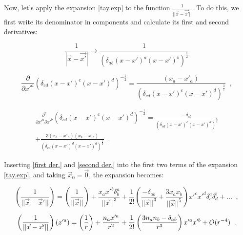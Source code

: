

Now, let's apply the expansion \ref{tay.exp} to the function $\frac{1}{||\vec{x}-\vec{x'}||}$. To do this, we first write its denominator in components and calculate its first and second derivatives:

$$ \frac{1}{|\vec{x}-\vec{x'}|} \rightarrow \frac{1}{(\delta_{ab} (x- x')^a (x- x')^b)^\frac{1}{2}}$$

\begin{equation}\label{first der.}
\frac{\partial}{\partial x'^a}(\delta_{cd} (x- x')^c (x- x')^d)^{-\frac{1}{2}} = \frac{(x_a - x'_a)}{(\delta_{cd} (x- x')^c (x- x')^d)^{\frac{3}{2}}} \;\; ,
\end{equation}

\begin{multline}\label{second der.}
\frac{\partial^2}{\partial x'^a \partial x'^b}(\delta_{cd} (x- x')^c (x- x')^d)^{-\frac{1}{2}} = \frac{-\delta_{ab}}{(\delta_{cd} (x- x')^c (x- x')^d)^{\frac{3}{2}}}\\ +\frac{3(x_a - x'_a)(x_b - x'_b)}{ (\delta_{cd} (x- x')^d (x- x')^d)^{\frac{5}{2}} } \;\; .
\end{multline}


Inserting  \ref{first der.} and \ref{second der.} into the first two terms of the expansion \ref{tay.exp}, and taking $\vec{x}_0 = \vec{0}$, the expansion becomes: 

\begin{equation}
\left( \frac{1}{|| \vec{x} - \vec{x}'||} \right) = \left( \frac{1}{|| \vec{x}||} \right) + \frac{x_a x'^b \delta^a_b}{||\vec{x}||^3} + \frac{1}{2!} \left(\frac{-\delta_{ab}}{||\vec{x}||^3} + \frac{3 x_a x_b}{||\vec{x}||^5}  \right) x'^c x'^d \delta^a_c \delta^b_d +  ... \;\; ,
\end{equation}


\begin{equation}
\left( \frac{1}{|| \vec{x} - \vec{x}'||} \right)(x'^a) = \left( \frac{1}{r} \right) + \frac{n_a x'^a}{r^2} + \\ \frac{1}{2!} \left(\frac{ 3 n_a n_b -\delta_{ab}}{r^3}  \right) x'^a x'^b + O(r^{-4})\;\; .
\end{equation}


